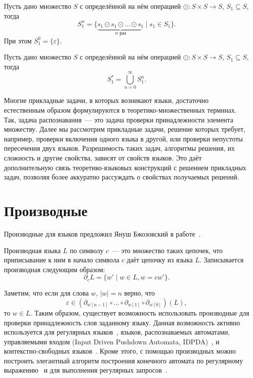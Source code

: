 \begin{definition}
    Пусть дано множество $S$ с определённой на нём операцией $\odot: S \times S \to S$, $S_1 \subseteq S$, тогда
    \[S_1^n = \{ \underbrace{s_1 \odot s_1 \odot \dots \odot s_1}_{\text{$n$ раз}} \mid s_1 \in S_1\}.\]
    При этом $S_1^0 = \{\varepsilon\}$.
\end{definition}

\begin{definition}
    Пусть дано множество $S$ с определённой на нём операцией $\odot: S \times S \to S$, $S_1 \subseteq S$, тогда
    \[S_1^* = \bigcup_{n = 0}^{\infty} S_1^n.\]
\end{definition}

Многие прикладные задачи, в которых возникают языки, достаточно естественным образом формулируются в теоретико-множественных терминах.
Так, задача распознавания~--- это задача проверки принадлежности элемента множеству.
Далее мы рассмотрим прикладные задачи, решение которых требует, например, проверки включения одного языка в другой, или проверки непустоты пересечения двух языков.
Разрешимость таких задач, алгоритмы решения, их сложность и другие свойства, зависят от свойств языков.
Это даёт дополнительную связь теоретико-языковых конструкций с решением прикладных задач, позволяя более аккуратно рассуждать о свойствах получаемых решений.

\section{Производные}

Производные для языков предложил Януш Бжозовский в работе~.

\begin{definition}
    Производная языка $L$ по символу $c$~--- это множество таких цепочек, что приписывание к ним в начало символа $c$ даёт цепочку из языка $L$.
    Записывается производная следующим образом: \[\partial_c L = \{ w' \mid w \in L, w = cw'\}.\]
\end{definition}

Заметим, что если для слова $w$, $|w| = n$ верно, что
\[\varepsilon \in (\partial_{w[n-1]} \circ \dots \circ \partial_{w[1]}  \circ \partial_{w[0]}) (L),\]
то $w \in L$.
Таким образом, существует возможность использовать производные для проверки принадлежность слов заданному языку.
Данная возможность активно используется для регулярных языков~, языков, распознаваемых автоматами, управляемыми входом (Input Driven Pushdown Automata, IDPDA)~, и контекстно-свободных языков~.
Кроме этого, с помощью производных можно построить элегантный алгоритм построения конечного автомата по регулярному выражению~ и для выполнения регулярных запросов~.

